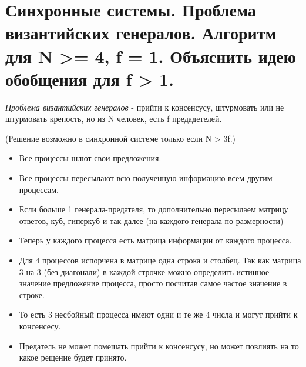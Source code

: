 \section{Синхронные системы. Проблема византийских генералов. Алгоритм для N >= 4, f = 1. Объяснить идею обобщения для f > 1.}

\begin{definition}
    \textit{Проблема византийских генералов} - прийти к консенсусу, штурмовать или не штурмовать крепость, но из N человек, есть f предадетелей.
\end{definition}

\begin{algorithm} (Решение возможно в синхронной системе только если N > 3f.)
    \begin{itemize}
    \item Все процессы шлют свои предложения.
    \item Все процессы пересылают всю полученную информацию всем другим процессам.
    \item Если больше 1 генерала-предателя, то дополнительно пересылаем матрицу ответов, куб, гиперкуб и так далее (на каждого генерала по размерности)
    \item Теперь у каждого процесса есть матрица информации от каждого процесса.
    \item Для 4 процессов испорчена в матрице одна строка и столбец. Так как матрица 3 на 3 (без диагонали) в каждой строчке можно определить истинное значение предложение процесса, просто посчитав самое частое значение в строке.
    \item То есть 3 несбойный процесса имеют одни и те же 4 числа и могут прийти к консенсесу.
    \item Предатель не может помешать прийти к консенсусу, но может повлиять на то какое рещение будет принято.
    \end{itemize}
\end{algorithm}

